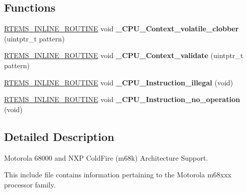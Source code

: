\subsection*{Functions}
\begin{DoxyCompactItemize}
\item 
\mbox{\label{group__RTEMSScoreCPUm68k_gaeb1ddd8f84f82b13fad2a05a3e7d0ab7}} 
\mbox{\hyperlink{group__RTEMSScoreBaseDefs_gac216239df231d5dbd15e3520b0b9313f}{R\+T\+E\+M\+S\+\_\+\+I\+N\+L\+I\+N\+E\+\_\+\+R\+O\+U\+T\+I\+NE}} void {\bfseries \+\_\+\+C\+P\+U\+\_\+\+Context\+\_\+volatile\+\_\+clobber} (uintptr\+\_\+t pattern)
\item 
\mbox{\label{group__RTEMSScoreCPUm68k_gaae027d9a906bb67d38ebd7a9104b976b}} 
\mbox{\hyperlink{group__RTEMSScoreBaseDefs_gac216239df231d5dbd15e3520b0b9313f}{R\+T\+E\+M\+S\+\_\+\+I\+N\+L\+I\+N\+E\+\_\+\+R\+O\+U\+T\+I\+NE}} void {\bfseries \+\_\+\+C\+P\+U\+\_\+\+Context\+\_\+validate} (uintptr\+\_\+t pattern)
\item 
\mbox{\label{group__RTEMSScoreCPUm68k_ga07618c93359f2485af2e98a96b330208}} 
\mbox{\hyperlink{group__RTEMSScoreBaseDefs_gac216239df231d5dbd15e3520b0b9313f}{R\+T\+E\+M\+S\+\_\+\+I\+N\+L\+I\+N\+E\+\_\+\+R\+O\+U\+T\+I\+NE}} void {\bfseries \+\_\+\+C\+P\+U\+\_\+\+Instruction\+\_\+illegal} (void)
\item 
\mbox{\label{group__RTEMSScoreCPUm68k_gab683a0a37a089e2a0fd3c356836d5499}} 
\mbox{\hyperlink{group__RTEMSScoreBaseDefs_gac216239df231d5dbd15e3520b0b9313f}{R\+T\+E\+M\+S\+\_\+\+I\+N\+L\+I\+N\+E\+\_\+\+R\+O\+U\+T\+I\+NE}} void {\bfseries \+\_\+\+C\+P\+U\+\_\+\+Instruction\+\_\+no\+\_\+operation} (void)
\end{DoxyCompactItemize}


\subsection{Detailed Description}
Motorola 68000 and N\+XP Cold\+Fire (m68k) Architecture Support. 

This include file contains information pertaining to the Motorola m68xxx processor family. 